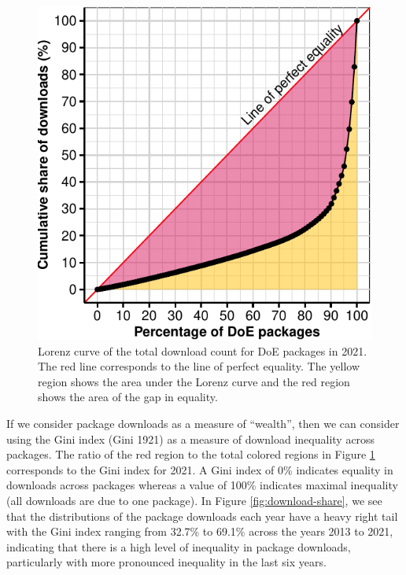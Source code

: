 \begin{figure}[htbp]

{\centering \includegraphics{figures/plot-lorenz-1} 

}

\caption{Lorenz curve of the total download count for DoE packages in 2021. The red line corresponds to the line of perfect equality. The yellow region shows the area under the Lorenz curve and the red region shows the area of the gap in equality.}\label{fig:plot-lorenz}
\end{figure}

If we consider package downloads as a measure of ``wealth'', then we can consider using the Gini index (Gini 1921) as a measure of download inequality across packages. The ratio of the red region to the total colored regions in Figure \ref{fig:plot-lorenz} corresponds to the Gini index for 2021. A Gini index of 0\% indicates equality in downloads across packages whereas a value of 100\% indicates maximal inequality (all downloads are due to one package). In Figure \ref{fig:download-share}, we see that the distributions of the package downloads each year have a heavy right tail with the Gini index ranging from 32.7\% to 69.1\% across the years 2013 to 2021, indicating that there is a high level of inequality in package downloads, particularly with more pronounced inequality in the last six years.

